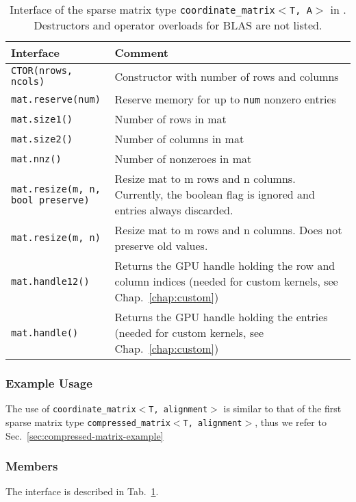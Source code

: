 \begin{table}[tb]
\begin{center}
\begin{tabular}{p{6.5cm}|p{8cm}}
Interface & Comment\\
\hline
\texttt{CTOR(nrows, ncols)}    & Constructor with number of rows and columns \\
\texttt{mat.reserve(num)}    & Reserve memory for up to \texttt{num} nonzero entries \\
\texttt{mat.size1()}            & Number of rows in mat \\
\texttt{mat.size2()}            & Number of columns in mat \\
\texttt{mat.nnz()}		& Number of nonzeroes in mat \\
\parbox{6cm}{\texttt{mat.resize(m, n, \\
           \hphantom{mat.resize(}bool preserve)}}    & Resize mat to m rows and n columns. Currently, the boolean flag is ignored and entries always discarded. \\
\texttt{mat.resize(m, n)}    & Resize mat to m rows and n columns. Does not preserve old values. \\
\texttt{mat.handle12()}  & Returns the GPU handle holding the row and column indices (needed for custom kernels, see Chap.~\ref{chap:custom}) \\
\texttt{mat.handle()}  & Returns the GPU handle holding the entries (needed for custom kernels, see Chap.~\ref{chap:custom})
\end{tabular}
\caption{Interface of the sparse matrix type \texttt{coordinate\_matrix$<$T, A$>$} in \ViennaCL. Destructors and operator overloads for BLAS are not listed.}
\label{tab:coordinate-matrix-interface}
\end{center}
\end{table}

\subsubsection{Example Usage}
The use of \texttt{coordinate\_matrix$<$T, alignment$>$} is similar to that of the first sparse matrix type 
\texttt{compressed\_matrix$<$T, alignment$>$}, thus we refer to Sec.~\ref{sec:compressed-matrix-example}


\subsubsection{Members}
The interface is described in Tab.~\ref{tab:coordinate-matrix-interface}. 
